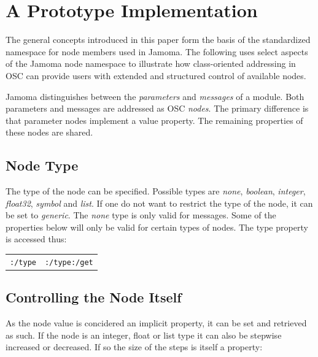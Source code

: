 \documentclass{NIME-alternate}
\begin{document}
\section{A Prototype Implementation} %
\label{sec:prototype_implementation}

The general concepts introduced in this paper form the basis of the standardized namespace for node members used in Jamoma. The following uses select aspects of the Jamoma node namespace to illustrate how class-oriented addressing in OSC can provide users with extended and structured control of available nodes.

Jamoma distinguishes between the \emph{parameters} and \emph{messages} of a module.  Both parameters and messages are addressed as OSC \emph{nodes}. The primary difference is that parameter nodes implement a value property.  The remaining properties of these nodes are shared.



\subsection{Node Type} %
\label{sub:type}

The type of the node can be specified. Possible types are \emph{none}, \emph{boolean}, \emph{integer}, \emph{float32}, \emph{symbol} and \emph{list}. If one do not want to restrict the type of the node, it can be set to \emph{generic}. The \emph{none} type is only valid for messages. Some of the properties below will only be valid for certain types of nodes. The type property is accessed thus:

\begin{tabular}{ll}
	\texttt{:/type} & \texttt{:/type:/get} \\
\end{tabular}




\subsection{Controlling the Node Itself} %
\label{sub:controlling_the_node_itself}

As the node value is concidered an implicit property, it can be set and retrieved as such. If the node is an integer, float or list type it can also be stepwise increased or decreased. If so the size of the steps is itself a property:
\end{document}
